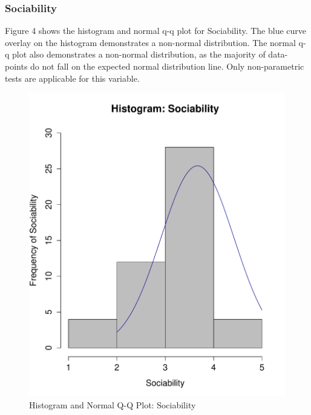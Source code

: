 \subsubsection{Sociability}

Figure 4 shows the histogram and normal q-q plot for Sociability. The blue curve overlay on the histogram demonstrates a non-normal distribution. The normal q-q plot also demonstrates a non-normal distribution, as the majority of data-points do not fall on the expected normal distribution line. Only non-parametric tests are applicable for this variable.

\begin{figure}[H]
\caption{Histogram and Normal Q-Q Plot: Sociability}
\centering
\includegraphics[scale=0.35]{./img/hist_sociability.pdf}

\end{figure}
